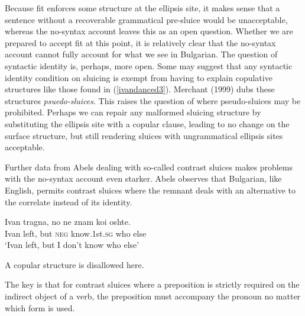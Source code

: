 \documentclass{turabian-researchpaper}
\begin{document}
Because fit enforces some structure at the ellipsis site, it makes sense that a sentence without a recoverable grammatical pre-sluice would be unacceptable, whereas the no-syntax account leaves this as an open question. Whether we are prepared to accept fit at this point, it is relatively clear that the no-syntax account cannot fully account for what we see in Bulgarian. The question of syntactic identity is, perhaps, more open. Some may suggest that any syntactic identity condition on sluicing is exempt from having to explain copulative structures like those found in (\ref{ivandanced3}). Merchant (1999) dubs these structures \textit{psuedo-sluices}. This raises the question of where pseudo-sluices may be prohibited. Perhaps we can repair any malformed sluicing structure by substituting the ellipsis site with a copular clause, leading to no change on the surface structure, but still rendering sluices with ungrammatical ellipsis sites acceptable. 

Further data from Abels dealing with so-called contrast sluices makes problems with the no-syntax account even starker. Abels observes that Bulgarian, like English, permits contrast sluices where the remnant deals with an alternative to the correlate instead of its identity. 
\begin{exe}
\ex\label{ivanleft1}
\gll Ivan tragna, no ne znam koi oshte.  \\
Ivan left, but \textsc{neg} know.1st.\textsc{sg} who else \\
\trans `Ivan left, but I don't know who else'
\end{exe}

\noindent A copular structure is disallowed here. 

\begin{exe} 
\ex
\begin{xlist} 
\end{xlist}
\end{exe}

The key is that for contrast sluices where a preposition is strictly required on the indirect object of a verb, the preposition must accompany the pronoun no matter which form is used. 
\end{document}
